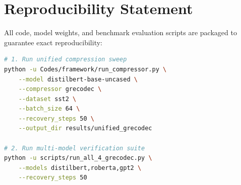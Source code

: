 \section{Reproducibility Statement}
All code, model weights, and benchmark evaluation scripts are packaged to guarantee exact reproducibility:
\begin{lstlisting}[language=bash]
# 1. Run unified compression sweep
python -u Codes/framework/run_compressor.py \
    --model distilbert-base-uncased \
    --compressor grecodec \
    --dataset sst2 \
    --batch_size 64 \
    --recovery_steps 50 \
    --output_dir results/unified_grecodec

# 2. Run multi-model verification suite
python -u scripts/run_all_4_grecodec.py \
    --models distilbert,roberta,gpt2 \
    --recovery_steps 50
\end{lstlisting}
